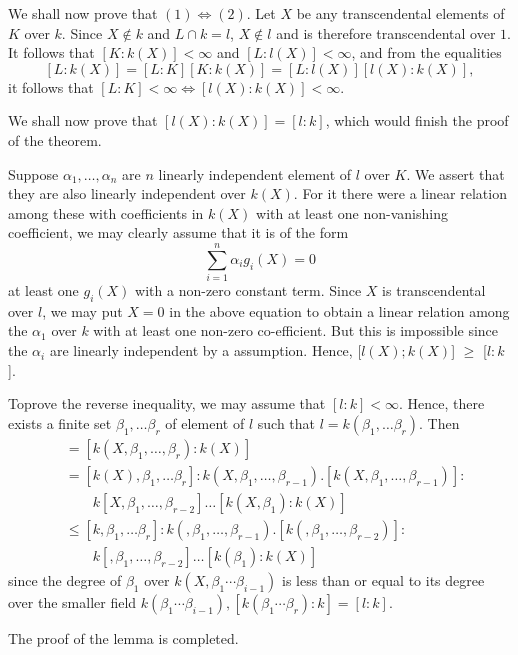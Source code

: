 We shall now prove that $(1)\Leftrightarrow (2)$. Let $X$ be any
transcendental elements of $K$ over $k$. Since $X \notin k$ and $L
\cap k=l$, $X\notin l$ and is therefore transcendental over $1$. It
follows that $[K: k(X)]< \infty$ and $[L:l (X)]< \infty$, and from the
equalities 
$$
[L: k(X)] = [L:K][K:k(X)]=[L:l(X)][l(X):k(X)],
$$
it follows that $[L:K]< \infty \Leftrightarrow [l(X):k(X)]< \infty$. 

We shall now prove that $[l(X) : k(X)]=[l:k]$, which would finish the
proof of the theorem. 

Suppose $\alpha_1, \ldots, \alpha_n$ are $n$ linearly independent
element of $l$ over $K$. We assert that they are also linearly
independent over $k(X)$. For it there were a linear relation among
these with coefficients in $k(X)$ with at least one non-vanishing
coefficient, we may clearly assume that it is of the form 
$$
\sum^n_{i=1}\alpha_i g_i(X)=0
$$
at least one $g_i(X)$ with a non-zero constant term. Since $X$ is
transcendental over $l$, we may put $X=0$ in the above equation to
obtain a linear relation among the $\alpha_1$ over $k$ with at least
one non-zero co-efficient. But this is impossible since the $\alpha_i$
are linearly independent by a assumption. Hence, [$l(X); k(X)$] $\geq$
[$l : k$]. 

To\pageoriginale prove the reverse inequality, we may assume that $[l:k]<
\infty$. Hence, there exists a finite set $\beta_1, \ldots \beta_r$ of
element of $l$ such that $l=k(\beta_1 ,\ldots \beta_r)$. Then 
\begin{align*}
[l(X):k(X)]& =[k(X, \beta_1 ,\ldots, \beta_r):k(X)]\\
  &=[k(X), \beta_1, \ldots \beta_r]:k(X,\beta_1 ,\ldots,
  \beta_{r-1}).[k(X, \beta_1, \ldots, \beta_{r-1})]:\\ 
  & \qquad k[X,\beta_1
    ,\ldots,\beta_{r-2}] \ldots [k(X,\beta_1):k(X)]\\ 
  &\leq [k, \beta_1, \ldots \beta_r]:k(,\beta_1 ,\ldots,
  \beta_{r-1}).[k(, \beta_1, \ldots, \beta_{r-2})]:\\ 
  & \qquad k[,\beta_1 ,\ldots, \beta_{r-2}] \ldots [k(\beta_1):k(X)]
\end{align*}
since the degree of $\beta_1$ over $k(X, \beta_1 \cdots \beta_{i-1})$
is less than or equal to its degree over the smaller field $k(\beta_1
\cdots \beta_{i-1}), [k(\beta_1 \cdots \beta_r):k]=[l:k]$. 

The proof of the lemma is completed.


